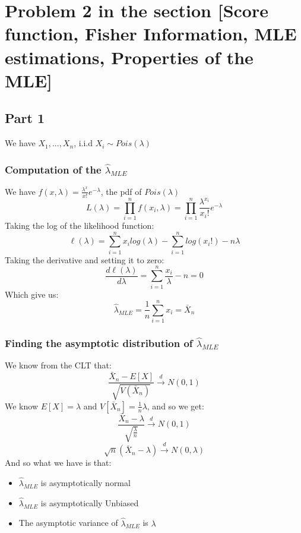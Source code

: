 \documentclass[12pt]{article}
\begin{document}
\section*{Problem 2 in the section [Score function, Fisher Information, MLE estimations, Properties of the MLE]}
\subsection*{Part 1}
We have $X_1, ..., X_n$, i.i.d $X_i\sim Pois(\lambda)$
\subsubsection*{Computation of the $\hat{\lambda}_{MLE}$}
We have $f(x,\lambda) = \frac{\lambda^x}{x!}e^{-\lambda}$, the pdf of $Pois(\lambda)$\\
\[
L(\lambda) = \prod_{i=1}^{n}f(x_i,\lambda) = \prod_{i=1}^{n}\frac{\lambda^{x_i}}{x_i!}e^{-\lambda}
\]
Taking the log of the likelihood function:
\[
\ell(\lambda) = \sum_{i=1}^{n}x_i log(\lambda) - \sum_{i=1}^{n}log(x_i!) - n\lambda
\]
Taking the derivative and setting it to zero:
\[
\frac{d\ell(\lambda)}{d\lambda} = \sum_{i=1}^{n}\frac{x_i}{\lambda} - n = 0
\]
Which give us: 
\[
\hat{\lambda}_{MLE} = \frac{1}{n}\sum_{i=1}^{n}x_i = \bar{X}_n
\]
\subsubsection*{Finding the asymptotic distribution of $\hat{\lambda}_{MLE}$}
We know from the CLT that:
\[
\frac{\bar{X}_n-E[X]}{\sqrt{V(\bar{X}_n)}} \xrightarrow{d} N(0,1)
\]
We know $E[X]= \lambda$ and $V[\bar{X}_n] = \frac{1}{n}\lambda$, and so we get: 
\[
\frac{\bar{X}_n-\lambda}{\sqrt{\frac{\lambda}{n}}} \xrightarrow{d} N(0,1)
\]
\[
\sqrt{n}(\bar{X}_n-\lambda) \xrightarrow{d} N(0,\lambda)
\]
And so what we have is that: 
\begin{itemize}
  \item $\hat{\lambda}_{MLE}$ is asymptotically normal
  \item $\hat{\lambda}_{MLE}$ is asymptotically Unbiased
  \item The asymptotic variance of $\hat{\lambda}_{MLE}$ is $\lambda$
\end{itemize}
\end{document}
